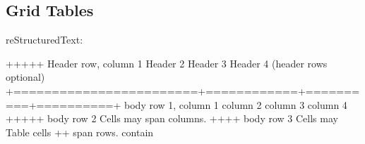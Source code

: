 \documentclass[letterpaper,12pt,english]{sphinxmanual}
\begin{document}
\subsection{Grid Tables}
\label{\detokenize{rtxt:grid-tables}}
reStructuredText:

\begin{sphinxVerbatim}[commandchars=\\\{\}]
+\PYGZhy{}\PYGZhy{}\PYGZhy{}\PYGZhy{}\PYGZhy{}\PYGZhy{}\PYGZhy{}\PYGZhy{}\PYGZhy{}\PYGZhy{}\PYGZhy{}\PYGZhy{}\PYGZhy{}\PYGZhy{}\PYGZhy{}\PYGZhy{}\PYGZhy{}\PYGZhy{}\PYGZhy{}\PYGZhy{}\PYGZhy{}\PYGZhy{}\PYGZhy{}\PYGZhy{}+\PYGZhy{}\PYGZhy{}\PYGZhy{}\PYGZhy{}\PYGZhy{}\PYGZhy{}\PYGZhy{}\PYGZhy{}\PYGZhy{}\PYGZhy{}\PYGZhy{}\PYGZhy{}+\PYGZhy{}\PYGZhy{}\PYGZhy{}\PYGZhy{}\PYGZhy{}\PYGZhy{}\PYGZhy{}\PYGZhy{}\PYGZhy{}\PYGZhy{}+\PYGZhy{}\PYGZhy{}\PYGZhy{}\PYGZhy{}\PYGZhy{}\PYGZhy{}\PYGZhy{}\PYGZhy{}\PYGZhy{}\PYGZhy{}+
 Header row, column 1   \textbar{} Header 2   \textbar{} Header 3 \textbar{} Header 4 \textbar{}
 (header rows optional) \textbar{}            \textbar{}          \textbar{}          \textbar{}
+========================+============+==========+==========+
 body row 1, column 1   \textbar{} column 2   \textbar{} column 3 \textbar{} column 4 \textbar{}
+\PYGZhy{}\PYGZhy{}\PYGZhy{}\PYGZhy{}\PYGZhy{}\PYGZhy{}\PYGZhy{}\PYGZhy{}\PYGZhy{}\PYGZhy{}\PYGZhy{}\PYGZhy{}\PYGZhy{}\PYGZhy{}\PYGZhy{}\PYGZhy{}\PYGZhy{}\PYGZhy{}\PYGZhy{}\PYGZhy{}\PYGZhy{}\PYGZhy{}\PYGZhy{}\PYGZhy{}+\PYGZhy{}\PYGZhy{}\PYGZhy{}\PYGZhy{}\PYGZhy{}\PYGZhy{}\PYGZhy{}\PYGZhy{}\PYGZhy{}\PYGZhy{}\PYGZhy{}\PYGZhy{}+\PYGZhy{}\PYGZhy{}\PYGZhy{}\PYGZhy{}\PYGZhy{}\PYGZhy{}\PYGZhy{}\PYGZhy{}\PYGZhy{}\PYGZhy{}+\PYGZhy{}\PYGZhy{}\PYGZhy{}\PYGZhy{}\PYGZhy{}\PYGZhy{}\PYGZhy{}\PYGZhy{}\PYGZhy{}\PYGZhy{}+
 body row 2             \textbar{} Cells may span columns.          \textbar{}
+\PYGZhy{}\PYGZhy{}\PYGZhy{}\PYGZhy{}\PYGZhy{}\PYGZhy{}\PYGZhy{}\PYGZhy{}\PYGZhy{}\PYGZhy{}\PYGZhy{}\PYGZhy{}\PYGZhy{}\PYGZhy{}\PYGZhy{}\PYGZhy{}\PYGZhy{}\PYGZhy{}\PYGZhy{}\PYGZhy{}\PYGZhy{}\PYGZhy{}\PYGZhy{}\PYGZhy{}+\PYGZhy{}\PYGZhy{}\PYGZhy{}\PYGZhy{}\PYGZhy{}\PYGZhy{}\PYGZhy{}\PYGZhy{}\PYGZhy{}\PYGZhy{}\PYGZhy{}\PYGZhy{}+\PYGZhy{}\PYGZhy{}\PYGZhy{}\PYGZhy{}\PYGZhy{}\PYGZhy{}\PYGZhy{}\PYGZhy{}\PYGZhy{}\PYGZhy{}\PYGZhy{}\PYGZhy{}\PYGZhy{}\PYGZhy{}\PYGZhy{}\PYGZhy{}\PYGZhy{}\PYGZhy{}\PYGZhy{}\PYGZhy{}\PYGZhy{}+
 body row 3             \textbar{} Cells may  \textbar{} \PYGZhy{} Table cells       \textbar{}
+\PYGZhy{}\PYGZhy{}\PYGZhy{}\PYGZhy{}\PYGZhy{}\PYGZhy{}\PYGZhy{}\PYGZhy{}\PYGZhy{}\PYGZhy{}\PYGZhy{}\PYGZhy{}\PYGZhy{}\PYGZhy{}\PYGZhy{}\PYGZhy{}\PYGZhy{}\PYGZhy{}\PYGZhy{}\PYGZhy{}\PYGZhy{}\PYGZhy{}\PYGZhy{}\PYGZhy{}+ span rows. \textbar{} \PYGZhy{} contain           \textbar{}

\end{sphinxVerbatim}
\end{document}

